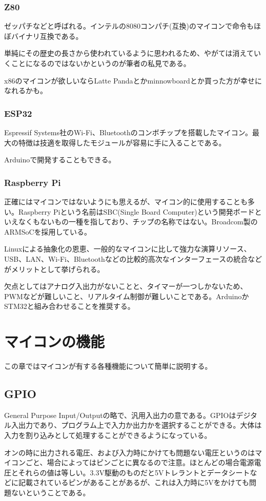 \documentclass[a4paper,titlepage,here]{ujarticle}
\begin{document}
\subsubsection{Z80}
ゼッパチなどと呼ばれる。インテルの8080コンパチ(互換)のマイコンで命令もほぼバイナリ互換である。

単純にその歴史の長さから使われているように思われるため、やがては消えていくことになるのではないかというのが筆者の私見である。

x86のマイコンが欲しいならLatte Pandaとかminnowboardとか買った方が幸せになれるかも。
\subsubsection{ESP32}
Espressif Systems社のWi-Fi、Bluetoothのコンボチップを搭載したマイコン。最大の特徴は技適を取得したモジュールが容易に手に入ることである。

Arduinoで開発することもできる。
\subsubsection{Raspberry Pi}
正確にはマイコンではないようにも思えるが、マイコン的に使用することも多い。Raspberry Piという名前はSBC(Single Board Computer)という開発ボードといえなくもないもの一種を指しており、チップの名称ではない。Broadcom製のARMSoCを採用している。

Linuxによる抽象化の恩恵、一般的なマイコンに比して強力な演算リソース、USB、LAN、Wi-Fi、Bluetoothなどの比較的高次なインターフェースの統合などがメリットとして挙げられる。

欠点としてはアナログ入出力がないことと、タイマーが一つしかないため、PWMなどが難しいこと、リアルタイム制御が難しいことである。ArduinoかSTM32と組み合わせることを推奨する。
\section{マイコンの機能}
この章ではマイコンが有する各種機能について簡単に説明する。
\subsection{GPIO}
General Purpose Input/Outputの略で、汎用入出力の意である。GPIOはデジタル入出力であり、プログラム上で入力か出力かを選択することができる。大体は入力を割り込みとして処理することができるようになっている。

オンの時に出力される電圧、および入力時にかけても問題ない電圧というのはマイコンごと、場合によってはピンごとに異なるので注意。ほとんどの場合電源電圧とそれらの値は等しい。3.3V駆動のものだと5Vトレラントとデータシートなどに記載されているピンがあることがあるが、これは入力時に5Vをかけても問題ないということである。
\end{document}
